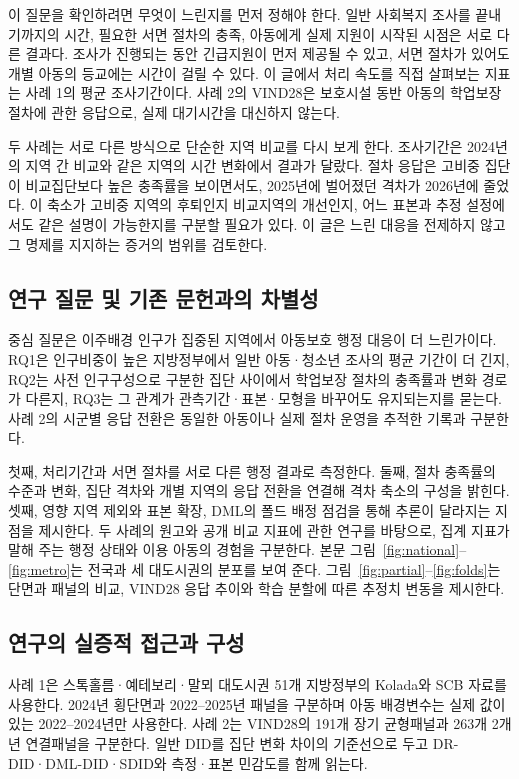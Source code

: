 \documentclass[11pt,a4paper]{article}
\begin{document}
이 질문을 확인하려면 무엇이 느린지를 먼저 정해야 한다. 일반 사회복지 조사를 끝내기까지의 시간, 필요한 서면 절차의 충족, 아동에게 실제 지원이 시작된 시점은 서로 다른 결과다. 조사가 진행되는 동안 긴급지원이 먼저 제공될 수 있고, 서면 절차가 있어도 개별 아동의 등교에는 시간이 걸릴 수 있다. 이 글에서 처리 속도를 직접 살펴보는 지표는 사례 1의 평균 조사기간이다. 사례 2의 VIND28은 보호시설 동반 아동의 학업보장 절차에 관한 응답으로, 실제 대기시간을 대신하지 않는다.

두 사례는 서로 다른 방식으로 단순한 지역 비교를 다시 보게 한다. 조사기간은 2024년의 지역 간 비교와 같은 지역의 시간 변화에서 결과가 달랐다. 절차 응답은 고비중 집단이 비교집단보다 높은 충족률을 보이면서도, 2025년에 벌어졌던 격차가 2026년에 줄었다. 이 축소가 고비중 지역의 후퇴인지 비교지역의 개선인지, 어느 표본과 추정 설정에서도 같은 설명이 가능한지를 구분할 필요가 있다. 이 글은 느린 대응을 전제하지 않고 그 명제를 지지하는 증거의 범위를 검토한다.

\subsection{연구 질문 및 기존 문헌과의 차별성}
중심 질문은 이주배경 인구가 집중된 지역에서 아동보호 행정 대응이 더 느린가이다. RQ1은 인구비중이 높은 지방정부에서 일반 아동·청소년 조사의 평균 기간이 더 긴지, RQ2는 사전 인구구성으로 구분한 집단 사이에서 학업보장 절차의 충족률과 변화 경로가 다른지, RQ3는 그 관계가 관측기간·표본·모형을 바꾸어도 유지되는지를 묻는다. 사례 2의 시군별 응답 전환은 동일한 아동이나 실제 절차 운영을 추적한 기록과 구분한다.

첫째, 처리기간과 서면 절차를 서로 다른 행정 결과로 측정한다. 둘째, 절차 충족률의 수준과 변화, 집단 격차와 개별 지역의 응답 전환을 연결해 격차 축소의 구성을 밝힌다. 셋째, 영향 지역 제외와 표본 확장, DML의 폴드 배정 점검을 통해 추론이 달라지는 지점을 제시한다. 두 사례의 원고와 공개 비교 지표에 관한 연구를 바탕으로\cite{case1,case2,trygged,denvall}, 집계 지표가 말해 주는 행정 상태와 이용 아동의 경험을 구분한다. 본문 그림~\ref{fig:national}--\ref{fig:metro}는 전국과 세 대도시권의 분포를 보여 준다. 그림~\ref{fig:partial}--\ref{fig:folds}는 단면과 패널의 비교, VIND28 응답 추이와 학습 분할에 따른 추정치 변동을 제시한다.

\subsection{연구의 실증적 접근과 구성}
사례 1은 스톡홀름·예테보리·말뫼 대도시권 51개 지방정부의 Kolada와 SCB 자료를 사용한다. 2024년 횡단면과 2022--2025년 패널을 구분하며 아동 배경변수는 실제 값이 있는 2022--2024년만 사용한다. 사례 2는 VIND28의 191개 장기 균형패널과 263개 2개년 연결패널을 구분한다. 일반 DID를 집단 변화 차이의 기준선으로 두고 DR-DID·DML-DID·SDID와 측정·표본 민감도를 함께 읽는다.
\end{document}

